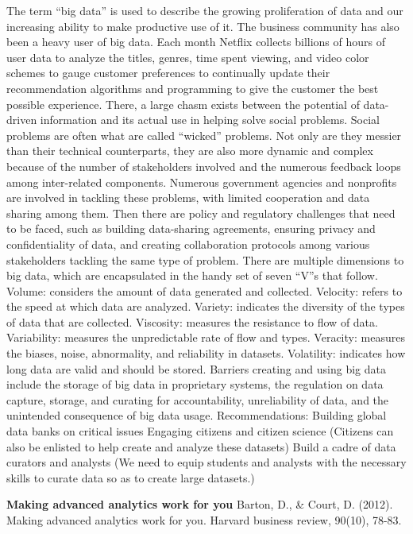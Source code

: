 \documentclass[]{book}
\begin{document}
The term ``big data'' is used to describe the growing proliferation of data and our increasing ability to make productive use of it. The business community has also been a heavy user of big data. Each month Netflix collects billions of hours of user data to analyze the titles, genres, time spent viewing, and video color schemes to gauge customer preferences to continually update their recommendation algorithms and programming to give the customer the best possible experience. There, a large chasm exists between the potential of data-driven information and its actual use in helping solve social problems. Social problems are often what are called ``wicked'' problems. Not only are they messier than their technical counterparts, they are also more dynamic and complex because of the number of stakeholders involved and the numerous feedback loops among inter-related components. Numerous government agencies and nonprofits are involved in tackling these problems, with limited cooperation and data sharing among them. Then there are policy and regulatory challenges that need to be faced, such as building data-sharing agreements, ensuring privacy and confidentiality of data, and creating collaboration protocols among various stakeholders tackling the same type of problem.
There are multiple dimensions to big data, which are encapsulated in the handy set of seven ``V''s that follow.
Volume: considers the amount of data generated and collected.
Velocity: refers to the speed at which data are analyzed.
Variety: indicates the diversity of the types of data that are collected. Viscosity: measures the resistance to flow of data.
Variability: measures the unpredictable rate of flow and types.
Veracity: measures the biases, noise, abnormality, and reliability in datasets.
Volatility: indicates how long data are valid and should be stored.
Barriers creating and using big data include the storage of big data in proprietary systems, the regulation on data capture, storage, and curating for accountability, unreliability of data, and the unintended consequence of big data usage.
Recommendations:
Building global data banks on critical issues
Engaging citizens and citizen science (Citizens can also be enlisted to help create and analyze these datasets)
Build a cadre of data curators and analysts (We need to equip students and analysts with the necessary skills to curate data so as to create large datasets.)

\textbf{Making advanced analytics work for you}
Barton, D., \& Court, D. (2012). Making advanced analytics work for you. Harvard business review, 90(10), 78-83.
\end{document}
